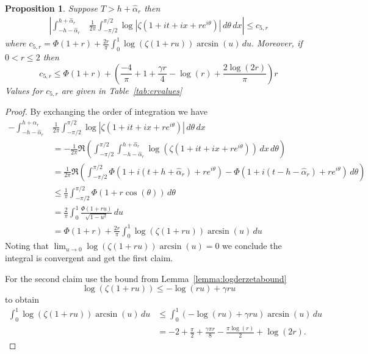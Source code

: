 \documentclass[10pt,english,letter, reqno]{amsart}
\theoremstyle{plain}
\newtheorem{proposition}[theorem]{Proposition}
\theoremstyle{definition}
\begin{document}
\begin{proposition}\label{prop:outside3}
Suppose $T>h+\hat{\alpha}_r$ then
   \begin{align*} \left|\int_{-h-\hat{\alpha}_r}^{h+\hat{\alpha}_r}\right.&  \left.\frac{1}{2\pi}\int_{-\pi/2}^{\pi/2} \log|\zeta(1+it+ix+re^{i\theta})|\,d\theta \,dx\right| \leq c_{5,r}
   \end{align*}
where $c_{5,r} =  \Phi(1+r) +  \frac{2r}{\pi}\int_{0}^{1} \log(\zeta(1+ru))\arcsin(u)\,du.$
Moreover, if $0 < r \leq 2$ then
\[  c_{5,r} \leq
\Phi(1+r)  + \left(\frac{-4}{\pi} +1+ \frac{\gamma r}{4} - \log(r)+ \frac{2\log(2 r)}{\pi} \right)r
\]
Values for $c_{5,r}$ are given in Table~\ref{tab:crvalues}
\end{proposition}
\begin{proof}
By exchanging the order of integration we have
\begin{align*} -\int_{-h-\hat{\alpha}_r}^{h+\hat{\alpha}_r}& \frac{1}{2\pi}\int_{-\pi/2}^{\pi/2} \log|\zeta(1+it+ix+re^{i\theta})|\,d\theta\,dx\\
& = -\frac{1}{2\pi}\Re\left(\int_{-\pi/2}^{\pi/2}\int_{-h-\hat{\alpha}_r}^{h+\hat{\alpha}_r} \log(\zeta(1+it+ix+re^{i\theta}))\,dx\,d\theta\right) \\
&=  \frac{1}{2\pi} \Re\left(\int_{-\pi/2}^{\pi/2} \Phi(1+i(t+h+\hat{\alpha}_r)+re^{i\theta}) - \Phi(1+i(t-h-\hat{\alpha}_r)+re^{i\theta})\,d\theta\right)\\
&\leq \frac{1}{\pi} \int_{-\pi/2}^{\pi/2}  \Phi(1+r\cos(\theta))\,d\theta\\
&= \frac{2}{\pi} \int_{0}^{1} \frac{\Phi(1+ru)}{\sqrt{1-u^2}}\,du\\
&= \Phi(1+r) +  \frac{2r}{\pi} \int_{0}^{1} \log(\zeta(1+ru))\arcsin(u)\,du
\end{align*} 
Noting that $\lim_{u\rightarrow0} \log(\zeta(1+ru))\arcsin(u) = 0$ we conclude the integral is convergent and get the first claim.


For the second claim use the bound from Lemma~\ref{lemma:logderzetabound}
\[  \log(\zeta(1+ru)) \leq  -\log(ru) + \gamma ru  \]
to obtain
\begin{align*}
 \int_0^1\log(\zeta(1+ru))\arcsin(u)\,du 
 &\leq \int_{0}^{1} ( -\log(ru) + \gamma ru )\arcsin(u)\,du \\
&= -2 + \frac{\pi}{2} + \frac{\gamma\pi r}{8} - \frac{\pi \log(r)}{2} +\log(2 r).
\end{align*}
\end{proof}
\end{document}
